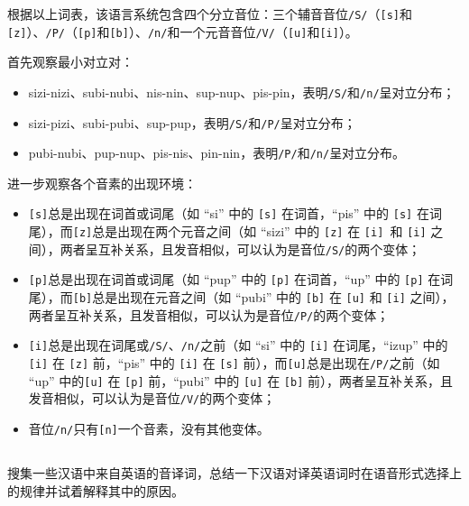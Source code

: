 \documentclass[10pt]{ctexart}
\begin{document}
\vspace{0.5cm}    

根据以上词表，该语言系统包含四个分立音位：三个辅音音位\texttt{/S/}（\texttt{[s]}和\texttt{[z]}）、\texttt{/P/}（\texttt{[p]}和\texttt{[b]}）、\texttt{/n/}和一个元音音位\texttt{/V/}（\texttt{[u]}和\texttt{[i]}）。

首先观察最小对立对：
\begin{itemize}
    \item sizi-nizi、subi-nubi、nis-nin、sup-nup、pis-pin，表明\texttt{/S/}和\texttt{/n/}呈对立分布；
    \item sizi-pizi、subi-pubi、sup-pup，表明\texttt{/S/}和\texttt{/P/}呈对立分布；
    \item pubi-nubi、pup-nup、pis-nis、pin-nin，表明\texttt{/P/}和\texttt{/n/}呈对立分布。
\end{itemize}

进一步观察各个音素的出现环境：
\begin{itemize}
    \item \texttt{[s]}总是出现在词首或词尾（如 ``si'' 中的 \texttt{[s]} 在词首，``pis'' 中的 \texttt{[s]} 在词尾），而\texttt{[z]}总是出现在两个元音之间（如 ``sizi'' 中的 \texttt{[z]} 在 \texttt{[i] }和 \texttt{[i]} 之间），两者呈互补关系，且发音相似，可以认为是音位\texttt{/S/}的两个变体；
    \item \texttt{[p]}总是出现在词首或词尾（如 ``pup'' 中的 \texttt{[p]} 在词首，``up'' 中的 \texttt{[p]} 在词尾），而\texttt{[b]}总是出现在元音之间（如 ``pubi'' 中的 \texttt{[b]} 在 \texttt{[u]} 和 \texttt{[i]} 之间），两者呈互补关系，且发音相似，可以认为是音位\texttt{/P/}的两个变体；
    \item \texttt{[i]}总是出现在词尾或\texttt{/S/}、\texttt{/n/}之前（如 ``si'' 中的 \texttt{[i]} 在词尾，``izup'' 中的 \texttt{[i]} 在 \texttt{[z]} 前，``pis'' 中的 \texttt{[i]} 在 \texttt{[s]} 前），而\texttt{[u]}总是出现在\texttt{/P/}之前（如 ``up'' 中的\texttt{[u]} 在 \texttt{[p]} 前，``pubi'' 中的 \texttt{[u]} 在 \texttt{[b]} 前），两者呈互补关系，且发音相似，可以认为是音位\texttt{/V/}的两个变体；
    \item 音位\texttt{/n/}只有\texttt{[n]}一个音素，没有其他变体。
\end{itemize}

\subsection{}
{\heiti
搜集一些汉语中来自英语的音译词，总结一下汉语对译英语词时在语音形式选择上的规律并试着解释其中的原因。
}
\end{document}
